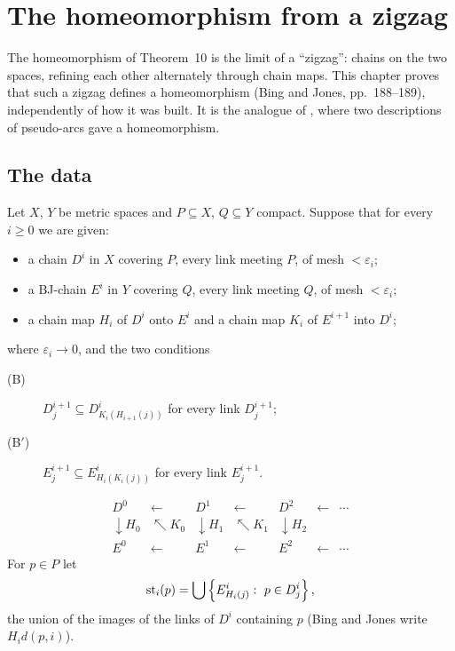 \chapter{The homeomorphism from a zigzag}\label{ch:zigzag}

The homeomorphism of Theorem~10 is the limit of a ``zigzag'': chains on the two spaces, refining each other alternately through chain maps. This chapter proves
that such a zigzag defines a homeomorphism (Bing and Jones, pp.~188--189), independently of how it was built. It is the analogue of , where
two descriptions of pseudo-arcs gave a homeomorphism.

\section{The data}

Let $X$, $Y$ be metric spaces and $P\subseteq X$, $Q\subseteq Y$ compact. Suppose that for every $i\ge0$ we are given:
\begin{itemize}
\item a chain $D^i$ in $X$ covering $P$, every link meeting $P$, of mesh $<\varepsilon_i$;
\item a BJ-chain $E^i$ in $Y$ covering $Q$, every link meeting $Q$, of mesh $<\varepsilon_i$;
\item a chain map $H_i$ of $D^i$ onto $E^i$ and a chain map $K_i$ of $E^{i+1}$ into $D^i$;
\end{itemize}
where $\varepsilon_i\to0$, and the two conditions
\begin{description}
\item[\textnormal{(B)}] $D^{i+1}_j\subseteq D^i_{K_i(H_{i+1}(j))}$ for every link $D^{i+1}_j$;
\item[\textnormal{(B$'$)}] $E^{i+1}_j\subseteq E^i_{H_i(K_i(j))}$ for every link $E^{i+1}_j$.
\end{description}
\[
\begin{array}{ccccccc}
D^0 & \longleftarrow & D^1 & \longleftarrow & D^2 & \longleftarrow & \cdots\\
\downarrow{\scriptstyle H_0} & \nwarrow{\scriptstyle K_0} & \downarrow{\scriptstyle H_1} & \nwarrow{\scriptstyle K_1} & \downarrow{\scriptstyle H_2} & & \\
E^0 & \longleftarrow & E^1 & \longleftarrow & E^2 & \longleftarrow & \cdots
\end{array}
\]
For $p\in P$ let
\[
\st_i(p)=\bigcup\set{E^i_{H_i(j)}:\ p\in D^i_j},
\]
the union of the images of the links of $D^i$ containing $p$ (Bing and Jones write $H_id(p,i)$).

